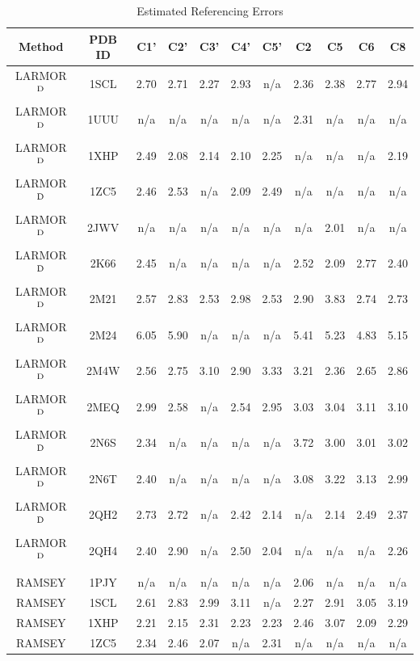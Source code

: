\documentclass[journal=jcisd8,manuscript=article,layout=onecolumn]{achemso}
\begin{document}
\begin{table}[h!]
\centering
\caption{Estimated Referencing Errors}
\begin{threeparttable}
\begin{tabular}{c c c c c c c c c c c}
\hline   
Method & PDB ID & C1' & C2' & C3' & C4' & C5' & C2 & C5 & C6 & C8  \\
\hline
LARMOR$^{\rm D}$ & 1SCL & 2.70 & 2.71 & 2.27 & 2.93 & n/a & 2.36 & 2.38 & 2.77 & 2.94 \\
LARMOR$^{\rm D}$ & 1UUU & n/a & n/a & n/a & n/a & n/a & 2.31 & n/a & n/a & n/a \\
LARMOR$^{\rm D}$ & 1XHP & 2.49 & 2.08 & 2.14 & 2.10 & 2.25 & n/a & n/a & n/a & 2.19 \\
LARMOR$^{\rm D}$ & 1ZC5 & 2.46 & 2.53 & n/a & 2.09 & 2.49 & n/a & n/a & n/a & n/a \\
LARMOR$^{\rm D}$ & 2JWV & n/a & n/a & n/a & n/a & n/a & n/a & 2.01 & n/a & n/a \\
LARMOR$^{\rm D}$ & 2K66 & 2.45 & n/a & n/a & n/a & n/a & 2.52 & 2.09 & 2.77 & 2.40 \\
LARMOR$^{\rm D}$ & 2M21 & 2.57 & 2.83 & 2.53 & 2.98 & 2.53 & 2.90 & 3.83 & 2.74 & 2.73 \\
LARMOR$^{\rm D}$ & 2M24 & 6.05 & 5.90 & n/a & n/a & n/a & 5.41 & 5.23 & 4.83 & 5.15 \\
LARMOR$^{\rm D}$ & 2M4W & 2.56 & 2.75 & 3.10 & 2.90 & 3.33 & 3.21 & 2.36 & 2.65 & 2.86 \\
LARMOR$^{\rm D}$ & 2MEQ & 2.99 & 2.58 & n/a & 2.54 & 2.95 & 3.03 & 3.04 & 3.11 & 3.10 \\
LARMOR$^{\rm D}$ & 2N6S & 2.34 & n/a & n/a & n/a & n/a & 3.72 & 3.00 & 3.01 & 3.02 \\
LARMOR$^{\rm D}$ & 2N6T & 2.40 & n/a & n/a & n/a & n/a & 3.08 & 3.22 & 3.13 & 2.99 \\
LARMOR$^{\rm D}$ & 2QH2 & 2.73 & 2.72 & n/a & 2.42 & 2.14 & n/a & 2.14 & 2.49 & 2.37 \\
LARMOR$^{\rm D}$ & 2QH4 & 2.40 & 2.90 & n/a & 2.50 & 2.04 & n/a & n/a & n/a & 2.26 \\
\\
RAMSEY  & 1PJY & n/a & n/a & n/a & n/a & n/a & 2.06 & n/a & n/a & n/a \\
RAMSEY  & 1SCL & 2.61 & 2.83 & 2.99 & 3.11 & n/a & 2.27 & 2.91 & 3.05 & 3.19 \\
RAMSEY  & 1XHP & 2.21 & 2.15 & 2.31 & 2.23 & 2.23 & 2.46 & 3.07 & 2.09 & 2.29 \\
RAMSEY  & 1ZC5 & 2.34 & 2.46 & 2.07 & n/a & 2.31 & n/a & n/a & n/a & n/a \\

\end{tabular}
\end{threeparttable}
\end{table}
\end{document}
